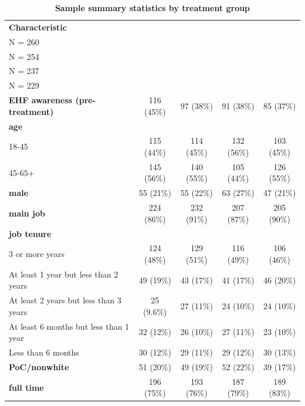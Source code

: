 \documentclass[
  11pt,
  oneside]{article}
\begin{document}
\begin{table}

\caption{\label{tab:tab-sum-wmt}\textbf{Sample summary statistics by treatment group}}
\centering
\begin{tabular}[t]{l|c|c|c|c}
\hline
\textbf{Characteristic} & \makecell[c]{\textbf{ctrl}\ \ \\N = 260} & \makecell[c]{\textbf{vid0}\ \ \\N = 254} & \makecell[c]{\textbf{vidChar}\ \ \\N = 237} & \makecell[c]{\textbf{vidSolid}\ \ \\N = 229}\\
\hline
\textbf{EHF awareness (pre-treatment)} & 116 (45\%) & 97 (38\%) & 91 (38\%) & 85 (37\%)\\
\hline
\textbf{age} &  &  &  & \\
\hline
\hspace{1em}18-45 & 115 (44\%) & 114 (45\%) & 132 (56\%) & 103 (45\%)\\
\hline
\hspace{1em}45-65+ & 145 (56\%) & 140 (55\%) & 105 (44\%) & 126 (55\%)\\
\hline
\textbf{male} & 55 (21\%) & 55 (22\%) & 63 (27\%) & 47 (21\%)\\
\hline
\textbf{main job} & 224 (86\%) & 232 (91\%) & 207 (87\%) & 205 (90\%)\\
\hline
\textbf{job tenure} &  &  &  & \\
\hline
\hspace{1em}3 or more years & 124 (48\%) & 129 (51\%) & 116 (49\%) & 106 (46\%)\\
\hline
\hspace{1em}At least 1 year but less than 2 years & 49 (19\%) & 43 (17\%) & 41 (17\%) & 46 (20\%)\\
\hline
\hspace{1em}At least 2 years but less than 3 years & 25 (9.6\%) & 27 (11\%) & 24 (10\%) & 24 (10\%)\\
\hline
\hspace{1em}At least 6 months but less than 1 year & 32 (12\%) & 26 (10\%) & 27 (11\%) & 23 (10\%)\\
\hline
\hspace{1em}Less than 6 months & 30 (12\%) & 29 (11\%) & 29 (12\%) & 30 (13\%)\\
\hline
\textbf{PoC/nonwhite} & 51 (20\%) & 49 (19\%) & 52 (22\%) & 39 (17\%)\\
\hline
\textbf{full time} & 196 (75\%) & 193 (76\%) & 187 (79\%) & 189 (83\%)\\

\end{tabular}
\end{table}
\end{document}
